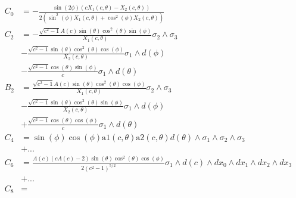 \begin{align*}
C_0 & = 
-\frac
{\sin(2 \phi ) (c X_1 (c,\theta)-X_2(c,\theta))}
{2  (\sin^2(\phi ) X_1(c,\theta)+\cos^2(\phi) X_2(c,\theta ))}\\
C_2 & = 
-\frac
{\sqrt{c^2-1} A(c) \sin(\theta ) \cos^2(\theta ) \sin(\phi )}
{X_1(c,\theta )}
\sigma_2\wedge \sigma_3\\
& 
-\frac
{\sqrt{c^2-1} \sin(\theta ) \cos^2(\theta ) \cos(\phi )}
{X_2(c,\theta )}
\sigma_1\wedge d(\phi)\\
& 
-\frac
{\sqrt{c^2-1} \cos(\theta ) \sin(\phi )}
{c} 
\sigma_1\wedge d(\theta )\\
B_2 & =
\frac
{\sqrt{c^2-1} A(c) \sin(\theta ) \cos^2(\theta ) \cos(\phi )}
{X_1(c,\theta )}
\sigma_2\wedge \sigma_3\\
&
-\frac
{\sqrt{c^2-1} \sin(\theta ) \cos^2(\theta ) \sin(\phi )}
{X_2(c,\theta )}
\sigma_1\wedge d(\phi)\\
&
+\frac
{\sqrt{c^2-1} \cos(\theta ) \cos(\phi ) }
{c}
\sigma_1\wedge d(\theta)\\
C_4 & = 
\sin(\phi ) \cos(\phi ) \text{a1}(c,\theta ) \text{a2}(c,\theta ) d(\theta )\wedge \sigma_1\wedge \sigma_2\wedge \sigma_3\\
&
+...\\
C_6 &=
\frac
{A(c) (c A(c)-2) \sin(\theta ) \cos^2(\theta ) \cos(\phi )}
{2 \left(c^2-1\right)^{5/2}} 
\sigma_1\wedge d(c)\wedge dx_0\wedge dx_1\wedge dx_2\wedge dx_3\\
&+...\\
C_8 &=
\end{align*}
